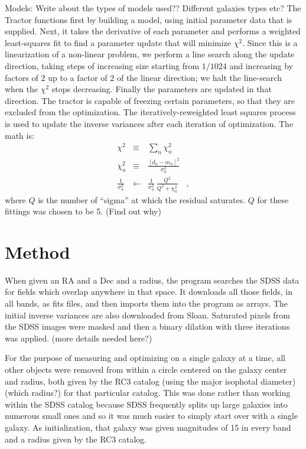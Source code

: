 \documentclass[12pt,preprint,pdftex]{aastex}
\begin{document}
Models: Write about the types of models used?? Different galaxies types etc?
The Tractor functions first by building a model, using initial parameter data that is supplied. Next, it takes the derivative of each parameter and performs a weighted least-squares fit to find a parameter update that will minimize $\chi^2$.  Since this is a linearization of a non-linear problem, we perform a line search along the update direction, taking steps of increasing size starting from $1/1024$ and increasing by factors of $2$ up to a factor of $2$ of the linear direction; we halt the line-search when the $\chi^2$ stops decreasing.  Finally the parameters are updated in that direction. The tractor is capable of freezing certain parameters, so that they are excluded from the optimization. 
The iteratively-reweighted least squares process is used to update the
inverse variances after each iteration of optimization. The math is:
\begin{eqnarray}
\chi^2 &\equiv& \sum_n \chi_n^2
\\
\chi_n^2 &\equiv& \frac{[d_n - m_n]^2}{\sigma_n^2}
\\
\frac{1}{\sigma_n^2} &\leftarrow& \frac{1}{\sigma_n^2}\,\frac{Q^2}{Q^2+\chi_n^2}
\quad ,
\end{eqnarray}
where $Q$ is the number of ``sigma'' at which the residual saturates. $Q$ for these fittings was chosen to be 5. (Find out why)

\section{Method}
When given an RA and a Dec and a radius, the program searches the SDSS data for fields which overlap anywhere in that space. It downloads all those fields, in all bands, as fits files, and then imports them into the program as arrays. The initial inverse variances are also downloaded from Sloan.
Saturated pixels from the SDSS images were masked and then a binary dilation with three iterations was applied. (more details needed here?)

For the purpose of measuring and optimizing on a single galaxy at a
time, all other objects were removed from within a circle centered on
the galaxy center and radius, both given by the RC3 catalog (using the major isophotal diameter)
(which radius?) for that particular catalog. This was done rather than
working within the SDSS catalog because SDSS frequently splits up large
galaxies into numerous small ones and so it was much easier to simply
start over with a single galaxy. As initialization, that galaxy was
given magnitudes of 15 in every band and a radius given by the RC3
catalog.
\end{document}
